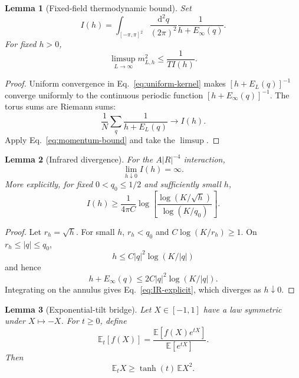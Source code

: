 \documentclass[aps,prb,preprint,notitlepage,groupedaddress,amsmath,amssymb,
               superscriptaddress,nofootinbib,floatfix]{revtex4-2}
\theoremstyle{definition}
\theoremstyle{plain}
\newtheorem{lemma}{Lemma}
\newcommand{\dd}{\mathrm{d}}
\begin{document}
\begin{lemma}[Fixed-field thermodynamic bound]
Set
\begin{equation}
 I(h)=
 \int_{[-\pi,\pi]^2}\frac{\dd^2q}{(2\pi)^2}
 \frac1{h+E_\infty(q)}.
\end{equation}
For fixed $h>0$,
\begin{equation}
 \boxed{\displaystyle
 \limsup_{L\to\infty}m_{L,h}^2\le\frac1{TI(h)}.}
 \label{eq:fixed-field}
\end{equation}
\end{lemma}

\begin{proof}
Uniform convergence in Eq.~\eqref{eq:uniform-kernel} makes
$[h+E_L(q)]^{-1}$ converge uniformly to the continuous periodic function
$[h+E_\infty(q)]^{-1}$.  The torus sums are Riemann sums:
\begin{equation}
 \frac1N\sum_q\frac1{h+E_L(q)}\longrightarrow I(h).
\end{equation}
Apply Eq.~\eqref{eq:momentum-bound} and take the $\limsup$.
\end{proof}

\begin{lemma}[Infrared divergence]
For the $A|R|^{-4}$ interaction,
\begin{equation}
 \boxed{\displaystyle\lim_{h\downarrow0}I(h)=\infty.}
 \label{eq:IR}
\end{equation}
More explicitly, for fixed $0<q_0\le1/2$ and sufficiently small $h$,
\begin{equation}
 I(h)\ge\frac1{4\pi C}
 \log\left[
 \frac{\log(K/\sqrt h)}{\log(K/q_0)}
 \right].
 \label{eq:IR-explicit}
\end{equation}
\end{lemma}

\begin{proof}
Let $r_h=\sqrt h$.  For small $h$, $r_h<q_0$ and
$C\log(K/r_h)\ge1$.  On $r_h\le|q|\le q_0$,
\begin{equation}
 h\le C|q|^2\log(K/|q|)
\end{equation}
and hence
\begin{equation}
 h+E_\infty(q)\le2C|q|^2\log(K/|q|).
\end{equation}
Integrating on the annulus gives Eq.~\eqref{eq:IR-explicit}, which diverges
as $h\downarrow0$.
\end{proof}

\begin{lemma}[Exponential-tilt bridge]
Let $X\in[-1,1]$ have a law symmetric under $X\mapsto-X$.  For $t\ge0$,
define
\begin{equation}
 \mathbb E_t[f(X)]
 =\frac{\mathbb E[f(X)e^{tX}]}{\mathbb E[e^{tX}]}.
\end{equation}
Then
\begin{equation}
 \boxed{\displaystyle
 \mathbb E_tX\ge\tanh(t)\,\mathbb EX^2.}
 \label{eq:tilt-bound}
\end{equation}
\end{lemma}
\end{document}
